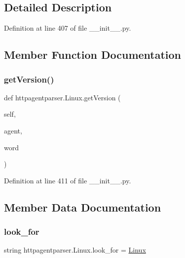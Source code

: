 \subsection{Detailed Description}


Definition at line 407 of file \+\_\+\+\_\+init\+\_\+\+\_\+.\+py.



\subsection{Member Function Documentation}
\hypertarget{classhttpagentparser_1_1_linux_a17c934ca567c661e411c3e9262400430}{}\label{classhttpagentparser_1_1_linux_a17c934ca567c661e411c3e9262400430} 
\subsubsection{\texorpdfstring{get\+Version()}{getVersion()}}
{\footnotesize\ttfamily def httpagentparser.\+Linux.\+get\+Version (\begin{DoxyParamCaption}\item[{}]{self,  }\item[{}]{agent,  }\item[{}]{word }\end{DoxyParamCaption})}



Definition at line 411 of file \+\_\+\+\_\+init\+\_\+\+\_\+.\+py.



\subsection{Member Data Documentation}
\hypertarget{classhttpagentparser_1_1_linux_a5a5485ce77649a86125d36ef00e02da7}{}\label{classhttpagentparser_1_1_linux_a5a5485ce77649a86125d36ef00e02da7} 
\subsubsection{\texorpdfstring{look\+\_\+for}{look\_for}}
{\footnotesize\ttfamily string httpagentparser.\+Linux.\+look\+\_\+for = \textquotesingle{}\hyperlink{classhttpagentparser_1_1_linux}{Linux}\textquotesingle{}\hspace{0.3cm}{\ttfamily [static]}}



